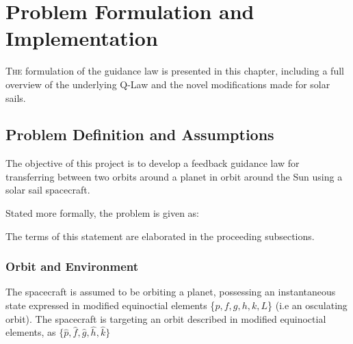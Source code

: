 \chapter{Problem Formulation and Implementation}

\lettrine{T}{he} formulation of the guidance law is presented in this chapter, including a full overview of the underlying Q-Law and the novel modifications made for solar sails.

\section{Problem Definition and Assumptions}
The objective of this project is to develop a feedback guidance law for transferring between two orbits around a planet in orbit around the Sun using a solar sail spacecraft.

Stated more formally, the problem is given as:


The terms of this statement are elaborated in the proceeding subsections.

\subsection{Orbit and Environment}
\label{sec:orbit_environment}
The spacecraft is assumed to be orbiting a planet, possessing an instantaneous state expressed in modified equinoctial elements \{\(p, f, g, h, k, L\)\} (i.e an osculating orbit). The spacecraft is targeting an orbit described in modified equinoctial elements, as \(\{\hat{p}, \hat{f}, \hat{g}, \hat{h}, \hat{k}\}\)

